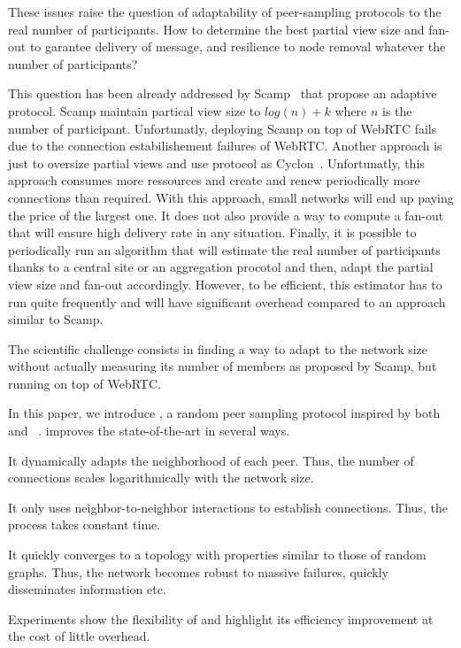 These issues raise the question of adaptability of peer-sampling
protocols to the real number of participants. How to determine the
best partial view size and fan-out to garantee delivery of message,
and resilience to node removal whatever the number of participants?

This question has been already addressed by
Scamp~\cite{ganesh2003peer} that propose an adaptive protocol. Scamp
maintain partical view size to $log(n)+k$ where $n$ is the number of
participant. Unfortunatly, deploying Scamp on top of WebRTC fails due
to the connection estabilishement failures of WebRTC. Another approach
is just to oversize partial views and use protocol as
Cyclon~\cite{voulgaris2005cyclon}. Unfortunatly, this approach
consumes more ressources and create and renew periodically more
connections than required. With this approach, small networks will end
up paying the price of the largest one. It does not also provide a way
to compute a fan-out that will ensure high delivery rate in any
situation. Finally, it is possible to
periodically run an algorithm that will estimate the real number of
participants thanks to a central site or an aggregation procotol and
then, adapt the partial view size and fan-out accordingly. However, to
be efficient, this estimator has to run quite frequently and will have
significant overhead compared to an approach similar to Scamp.

The scientific challenge consists in finding a way to adapt to the
network size without actually measuring its number of members as
proposed by Scamp, but running on top of WebRTC.

In this paper, we introduce \SPRAY, a random peer sampling protocol inspired by
both \SCAMP~\cite{ganesh2003peer} and \CYCLON~\cite{voulgaris2005cyclon}. \SPRAY
improves the state-of-the-art in several ways.
\begin{inparaenum}[(i)]
\item It dynamically adapts the neighborhood of each peer. Thus, the
  number of connections scales logarithmically with the network size.
\item It only uses neighbor-to-neighbor interactions to establish
  connections. Thus, the process takes constant time.
\item It quickly converges to a topology with properties similar to
  those of random graphs. Thus, the network becomes robust to massive
  failures, quickly disseminates information etc.
\item Experiments show the flexibility of \SPRAY and highlight its
  efficiency improvement at the cost of little overhead.
\end{inparaenum}

